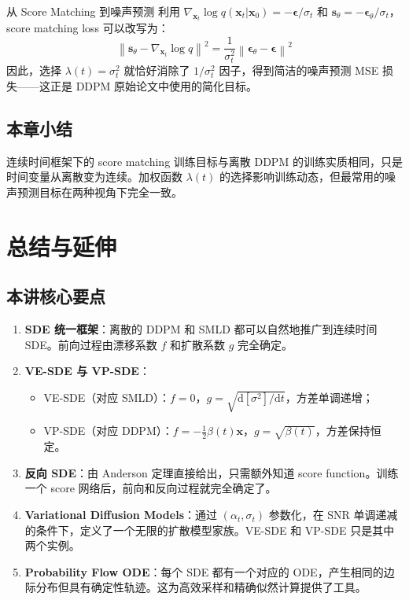 \documentclass[a4paper]{article}
\begin{document}
\begin{knowledgebox}{从 Score Matching 到噪声预测}
利用 $\nabla_{\mathbf{x}_t}\log q(\mathbf{x}_t|\mathbf{x}_0) = -\boldsymbol{\epsilon}/\sigma_t$ 和 $\mathbf{s}_\theta = -\boldsymbol{\epsilon}_\theta / \sigma_t$，score matching loss 可以改写为：
$$
\left\|\mathbf{s}_\theta - \nabla_{\mathbf{x}_t}\log q\right\|^2 = \frac{1}{\sigma_t^2}\left\|\boldsymbol{\epsilon}_\theta - \boldsymbol{\epsilon}\right\|^2
$$
因此，选择 $\lambda(t) = \sigma_t^2$ 就恰好消除了 $1/\sigma_t^2$ 因子，得到简洁的噪声预测 MSE 损失——这正是 DDPM 原始论文中使用的简化目标。
\end{knowledgebox}

\subsection{本章小结}

连续时间框架下的 score matching 训练目标与离散 DDPM 的训练实质相同，只是时间变量从离散变为连续。加权函数 $\lambda(t)$ 的选择影响训练动态，但最常用的噪声预测目标在两种视角下完全一致。


\section{总结与延伸}

\subsection{本讲核心要点}

\begin{enumerate}
    \item \textbf{SDE 统一框架}：离散的 DDPM 和 SMLD 都可以自然地推广到连续时间 SDE。前向过程由漂移系数 $f$ 和扩散系数 $g$ 完全确定。

    \item \textbf{VE-SDE 与 VP-SDE}：
    \begin{itemize}
        \item VE-SDE（对应 SMLD）：$f = 0$，$g = \sqrt{\mathrm{d}[\sigma^2]/\mathrm{d}t}$，方差单调递增；
        \item VP-SDE（对应 DDPM）：$f = -\frac{1}{2}\beta(t)\mathbf{x}$，$g = \sqrt{\beta(t)}$，方差保持恒定。
    \end{itemize}

    \item \textbf{反向 SDE}：由 Anderson 定理直接给出，只需额外知道 score function。训练一个 score 网络后，前向和反向过程就完全确定了。

    \item \textbf{Variational Diffusion Models}：通过 $(\alpha_t, \sigma_t)$ 参数化，在 SNR 单调递减的条件下，定义了一个无限的扩散模型家族。VE-SDE 和 VP-SDE 只是其中两个实例。

    \item \textbf{Probability Flow ODE}：每个 SDE 都有一个对应的 ODE，产生相同的边际分布但具有确定性轨迹。这为高效采样和精确似然计算提供了工具。
\end{enumerate}
\end{document}
